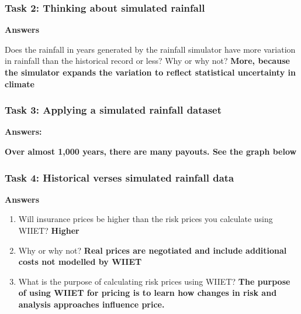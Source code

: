 \documentclass[letterpaper,10pt,english]{sphinxmanual}
\begin{document}
\subsubsection{Task 2: Thinking about simulated rainfall}
\label{wiiet/wiiet_influenceshortdatasetsanskey:task-2-thinking-about-simulated-rainfall}
\textbf{Answers}

Does the rainfall in years generated by the rainfall simulator have more variation in rainfall than the historical record or less?  Why or why not? \textbf{More, because the simulator expands the variation to reflect statistical uncertainty in climate}


\subsubsection{Task 3: Applying a simulated rainfall dataset}
\label{wiiet/wiiet_influenceshortdatasetsanskey:task-3-applying-a-simulated-rainfall-dataset}
\textbf{Answers:}

\textbf{Over almost 1,000 years, there are many payouts. See the graph below}

{\hfill}


\subsubsection{Task 4: Historical verses simulated rainfall data}
\label{wiiet/wiiet_influenceshortdatasetsanskey:task-4-historical-verses-simulated-rainfall-data}
\textbf{Answers}
\begin{enumerate}
\item {} 
Will insurance prices be higher than the risk prices you calculate using WIIET? \textbf{Higher}

\item {} 
Why or why not? \textbf{Real prices are negotiated and include additional costs not modelled by WIIET}

\item {} 
What is the purpose of calculating risk prices using WIIET? \textbf{The purpose of using WIIET for pricing is to learn how changes in risk and analysis approaches influence price.}

\end{enumerate}
\end{document}
